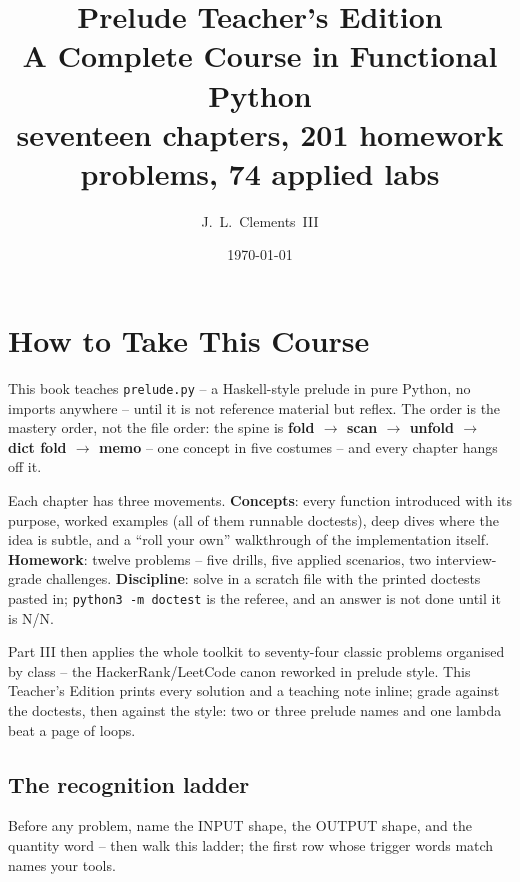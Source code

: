 \documentclass[10pt,letterpaper]{book}
\title{\Huge\bfseries Prelude Teacher's Edition\\[6pt]\Large A Complete Course in Functional Python\\[14pt]\normalsize seventeen chapters, 201 homework problems, 74 applied labs}
\author{J.~L.~Clements~III}
\date{\today}
\begin{document}
\frontmatter
\maketitle

\chapter{How to Take This Course}
This book teaches \texttt{prelude.py} -- a Haskell-style prelude in pure
Python, no imports anywhere -- until it is not reference material but
reflex. The order is the mastery order, not the file order: the spine is
\textbf{fold $\rightarrow$ scan $\rightarrow$ unfold $\rightarrow$ dict fold
$\rightarrow$ memo} -- one concept in five costumes -- and every chapter
hangs off it.

Each chapter has three movements. \textbf{Concepts}: every function
introduced with its purpose, worked examples (all of them runnable
doctests), deep dives where the idea is subtle, and a ``roll your own''
walkthrough of the implementation itself. \textbf{Homework}: twelve
problems -- five drills, five applied scenarios, two interview-grade
challenges. \textbf{Discipline}: solve in a scratch file with the printed
doctests pasted in; \texttt{python3 -m doctest} is the referee, and an
answer is not done until it is N/N.

Part III then applies the whole toolkit to seventy-four classic problems
organised by class -- the HackerRank/LeetCode canon reworked in prelude
style. This Teacher's Edition prints every solution and a teaching note inline; grade against the doctests, then against the style: two or three prelude names and one lambda beat a page of loops.

\section*{The recognition ladder}
Before any problem, name the INPUT shape, the OUTPUT shape, and the quantity
word -- then walk this ladder; the first row whose trigger words match names
your tools.
\end{document}

